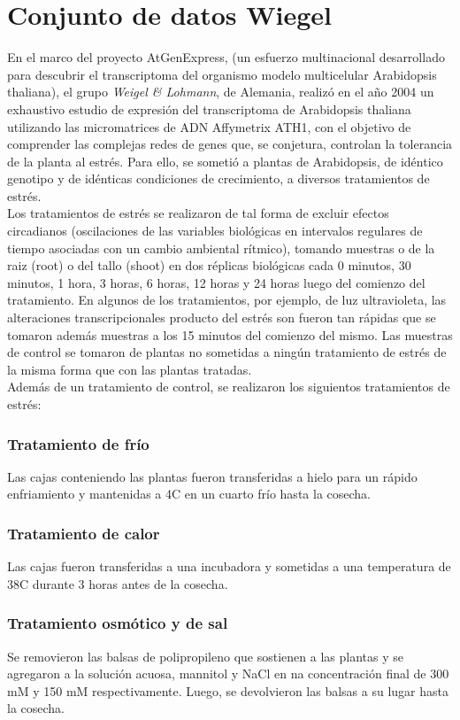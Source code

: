 \section{Conjunto de datos Wiegel}
En el marco del proyecto AtGenExpress, (un esfuerzo multinacional desarrollado para descubrir el transcriptoma del organismo modelo multicelular Arabidopsis thaliana), el grupo \textit{Weigel \& Lohmann}, de Alemania, realizó en el año 2004 un exhaustivo estudio de expresión del transcriptoma de Arabidopsis thaliana utilizando las micromatrices de ADN Affymetrix ATH1, con el objetivo de comprender las complejas redes de genes que, se conjetura, controlan la tolerancia de la planta al estrés. Para ello, se sometió a plantas de Arabidopsis, de idéntico genotipo y de idénticas condiciones de crecimiento, a diversos tratamientos de estrés.\\
Los tratamientos de estrés se realizaron de tal forma de excluir efectos circadianos (oscilaciones de las variables biológicas en intervalos regulares de tiempo asociadas con un cambio ambiental rítmico), tomando muestras o de la raiz (root) o del tallo (shoot) en dos réplicas biológicas cada 0 minutos, 30 minutos, 1 hora, 3 horas, 6 horas, 12 horas y 24 horas luego del comienzo del tratamiento. En algunos de los tratamientos, por ejemplo, de luz ultravioleta, las alteraciones transcripcionales producto del estrés son fueron tan rápidas que se tomaron además muestras a los 15 minutos del comienzo  del mismo. Las muestras de control se tomaron de plantas no sometidas a ningún tratamiento de estrés de la misma forma que con las plantas tratadas.\\
Además de un tratamiento de control, se realizaron los siguientos tratamientos de estrés:
\subsubsection*{Tratamiento de frío}
Las cajas conteniendo las plantas fueron transferidas a hielo para un rápido enfriamiento y mantenidas a 4\degree C en un cuarto frío hasta la cosecha.
\subsubsection*{Tratamiento de calor}
Las cajas fueron transferidas a una incubadora y sometidas a una temperatura de 38\degree C durante 3 horas antes de la cosecha.
\subsubsection*{Tratamiento osmótico y de sal}
Se removieron las balsas de polipropileno que sostienen a las plantas y se agregaron a la solución acuosa, mannitol y NaCl en na concentración final de 300 mM y 150 mM respectivamente. Luego, se devolvieron las balsas a su lugar hasta la cosecha.
